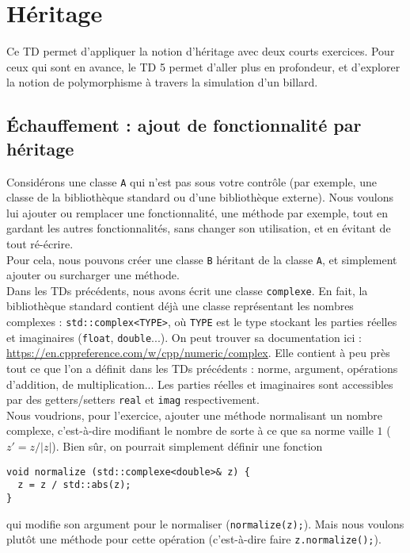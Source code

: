 \documentclass{book}
\newcommand{\inline}[1]{\texttt{#1}}
\begin{document}
\setcounter{chapter}{3}

\chapter{Héritage}

Ce TD permet d'appliquer la notion d'héritage avec deux courts exercices. Pour ceux qui sont en avance, le TD 5 permet d'aller plus en profondeur, et d'explorer la notion de polymorphisme à travers la simulation d'un billard.

\section{Échauffement : ajout de fonctionnalité par héritage}

Considérons une classe \inline{A} qui n'est pas sous votre contrôle (par exemple, une classe de la bibliothèque standard ou d'une bibliothèque externe). Nous voulons lui ajouter ou remplacer une fonctionnalité, une méthode par exemple, tout en gardant les autres fonctionnalités, sans changer son utilisation, et en évitant de tout ré-écrire.\\

Pour cela, nous pouvons créer une classe \inline{B} héritant de la classe \inline{A}, et simplement ajouter ou surcharger une méthode.\\

Dans les TDs précédents, nous avons écrit une classe \inline{complexe}. En fait, la bibliothèque standard contient déjà une classe représentant les nombres complexes : \inline{std::complex<TYPE>}, où \inline{TYPE} est le type stockant les parties réelles et imaginaires (\inline{float}, \inline{double}...). On peut trouver sa documentation ici : \url{https://en.cppreference.com/w/cpp/numeric/complex}. Elle contient à peu près tout ce que l'on a définit dans les TDs précédents : norme, argument, opérations d'addition, de multiplication... Les parties réelles et imaginaires sont accessibles par des getters/setters \inline{real} et \inline{imag} respectivement.\\

Nous voudrions, pour l'exercice, ajouter une méthode normalisant un nombre complexe, c'est-à-dire modifiant le nombre de sorte à ce que sa norme vaille $1$ ($z'=z/|z|$). Bien sûr, on pourrait simplement définir une fonction
\begin{verbatim}
void normalize (std::complexe<double>& z) {
  z = z / std::abs(z);
}
\end{verbatim}
qui modifie son argument pour le normaliser (\inline{normalize(z);}). Mais nous voulons plutôt une méthode pour cette opération (c'est-à-dire faire \inline{z.normalize();}).\\
\end{document}
